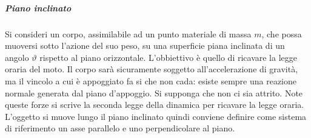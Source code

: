 \subparagraph{Piano inclinato} Si consideri un corpo, assimilabile ad un punto materiale di massa $m$, che possa muoversi sotto l'azione del suo peso, su una superficie piana inclinata di un angolo $\vartheta$ rispetto al piano orizzontale. L'obbiettivo è quello di ricavare la legge oraria del moto. Il corpo sarà sicuramente soggetto all'accelerazione di gravità, ma il vincolo a cui è appoggiato fa si che non cada: esiste sempre una reazione normale generata dal piano d'appoggio. Si supponga che non ci sia attrito. Note queste forze si scrive la seconda legge della dinamica per ricavare la legge oraria. L'oggetto si muove lungo il piano inclinato quindi conviene definire come sistema di riferimento un asse parallelo e uno perpendicolare al piano.

\begin{figure}[htpb]
	\centering


	\begin{tikzpicture}[x=0.75pt,y=0.75pt,yscale=-1,xscale=1]


\end{tikzpicture}
\end{figure}
